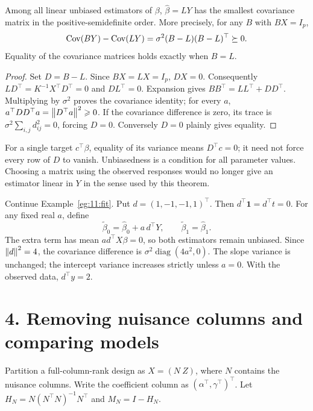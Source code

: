 \begin{theorem}\label{thm:11:gm}
Among all linear unbiased estimators of $\beta$, $\widehat\beta=LY$ has
the smallest covariance matrix in the positive-semidefinite order.
More precisely, for any $B$ with $BX=I_p$,
\[
\operatorname{Cov}(BY)-\operatorname{Cov}(LY)=\sigma^2(B-L)(B-L)^\top\succeq0.
\]
Equality of the covariance matrices holds exactly when $B=L$.
\end{theorem}
\begin{proof}
Set $D=B-L$. Since $BX=LX=I_p$, $DX=0$.
Consequently $LD^\top=K^{-1}X^\top D^\top=0$ and $DL^\top=0$.
Expansion gives $BB^\top=LL^\top+DD^\top$.
Multiplying by $\sigma^2$ proves the covariance identity; for every $a$,
$a^\top DD^\top a=\left\lVert D^\top a\right\rVert^2\geqslant0$.
If the covariance difference is zero, its trace is
$\sigma^2\sum_{i,j}d_{ij}^2=0$, forcing $D=0$.
Conversely $D=0$ plainly gives equality.
\end{proof}

For a single target $c^\top\beta$, equality of its variance means
$D^\top c=0$; it need not force every row of $D$ to vanish.
Unbiasedness is a condition for all parameter values. Choosing a matrix
using the observed responses would no longer give an estimator linear
in $Y$ in the sense used by this theorem.

\begin{example}
Continue Example~\ref{eg:11:fit}. Put $d=(1,-1,-1,1)^\top$.
Then $d^\top\mathbf1=d^\top t=0$. For any fixed real $a$, define
\[
\widetilde\beta_0=\widehat\beta_0+a\,d^\top Y,\qquad
\widetilde\beta_1=\widehat\beta_1.
\]
The extra term has mean $a d^\top X\beta=0$, so both estimators remain
unbiased. Since $\left\lVert d\right\rVert^2=4$, the covariance difference is
$\sigma^2\operatorname{diag}(4a^2,0)$.
The slope variance is unchanged; the intercept variance increases strictly
unless $a=0$. With the observed data, $d^\top y=2$.
\end{example}

\section*{4. Removing nuisance columns and comparing models}
Partition a full-column-rank design as $X=(N\ Z)$, where $N$ contains
the nuisance columns. Write the coefficient column as $(\alpha^\top,\gamma^\top)^\top$.
Let $H_N=N(N^\top N)^{-1}N^\top$ and $M_N=I-H_N$.

